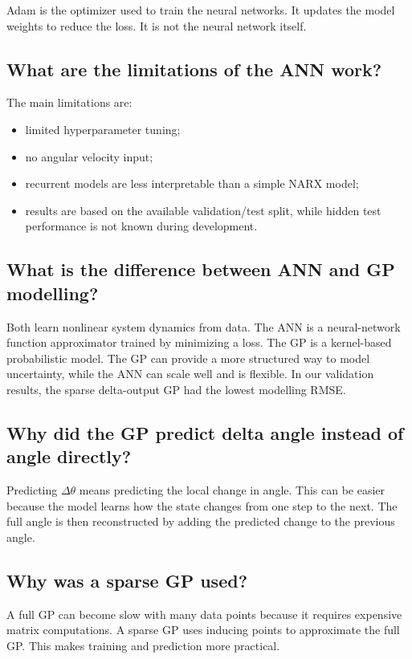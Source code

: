 \documentclass[11pt,a4paper]{article}
\begin{document}
Adam is the optimizer used to train the neural networks.
It updates the model weights to reduce the loss.
It is not the neural network itself.

\subsection*{What are the limitations of the ANN work?}

The main limitations are:

\begin{itemize}
    \item limited hyperparameter tuning;
    \item no angular velocity input;
    \item recurrent models are less interpretable than a simple NARX model;
    \item results are based on the available validation/test split, while hidden test performance is not known during development.
\end{itemize}

\subsection*{What is the difference between ANN and GP modelling?}

Both learn nonlinear system dynamics from data.
The ANN is a neural-network function approximator trained by minimizing a loss.
The GP is a kernel-based probabilistic model.
The GP can provide a more structured way to model uncertainty, while the ANN can scale well and is flexible.
In our validation results, the sparse delta-output GP had the lowest modelling RMSE.

\subsection*{Why did the GP predict delta angle instead of angle directly?}

Predicting $\Delta\theta$ means predicting the local change in angle.
This can be easier because the model learns how the state changes from one step to the next.
The full angle is then reconstructed by adding the predicted change to the previous angle.

\subsection*{Why was a sparse GP used?}

A full GP can become slow with many data points because it requires expensive matrix computations.
A sparse GP uses inducing points to approximate the full GP.
This makes training and prediction more practical.
\end{document}

